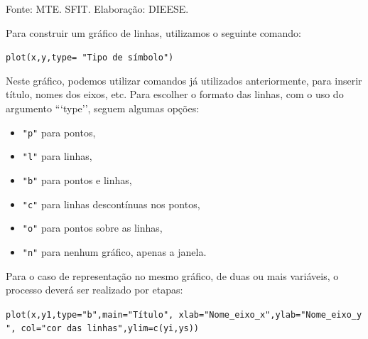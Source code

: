 \documentclass[12pt,brazil,oneside]{book}
\newenvironment{Shaded}{\begin{snugshade}}{\end{snugshade}}
\newcommand{\DataTypeTok}[1]{\textcolor[rgb]{0.13,0.29,0.53}{#1}}
\newcommand{\DecValTok}[1]{\textcolor[rgb]{0.00,0.00,0.81}{#1}}
\newcommand{\KeywordTok}[1]{\textcolor[rgb]{0.13,0.29,0.53}{\textbf{#1}}}
\newcommand{\NormalTok}[1]{#1}
\newcommand{\OperatorTok}[1]{\textcolor[rgb]{0.81,0.36,0.00}{\textbf{#1}}}
\newcommand{\StringTok}[1]{\textcolor[rgb]{0.31,0.60,0.02}{#1}}
\providecommand{\tightlist}{%
  \setlength{\itemsep}{0pt}\setlength{\parskip}{0pt}}
\begin{document}
Fonte: MTE. SFIT. Elaboração: DIEESE.

Para construir um gráfico de linhas, utilizamos o seguinte comando:

\texttt{plot(x,y,type=\ "Tipo\ de\ símbolo")}

Neste gráfico, podemos utilizar comandos já utilizados anteriormente,
para inserir título, nomes dos eixos, etc. Para escolher o formato das
linhas, com o uso do argumento ```type''\textbar{}, seguem algumas
opções:

\begin{itemize}
\tightlist
\item
  \texttt{"p"} para pontos,
\item
  \texttt{"l"} para linhas,
\item
  \texttt{"b"} para pontos e linhas,
\item
  \texttt{"c"} para linhas descontínuas nos pontos,
\item
  \texttt{"o"} para pontos sobre as linhas,
\item
  \texttt{"n"} para nenhum gráfico, apenas a janela.
\end{itemize}

Para o caso de representação no mesmo gráfico, de duas ou mais
variáveis, o processo deverá ser realizado por etapas:

\texttt{plot(x,y1,type="b",main="Título",\ xlab="Nome\_eixo\_x",ylab="Nome\_eixo\_y",\ col="cor\ das\ linhas",ylim=c(yi,ys))}

\begin{Shaded}
\end{Shaded}
\end{document}
